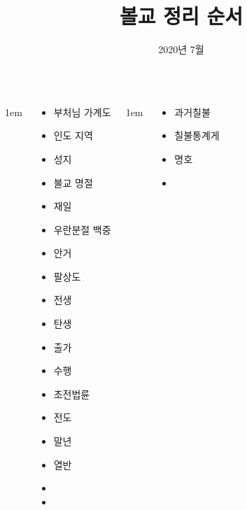 \documentclass[	20pt, 
							a0paper, 
							landscape,
							margin=0mm, %
							innermargin=10mm,  		%
							blockverticalspace=4mm, %
							colspace=5mm, 
							subcolspace=0mm
							]{tikzposter}
\title{ 볼교 정리 순서 }
\author{ 2020년 7월 }
\begin{document}
	\maketitle[
					width=841mm,
					linewidth = 2mm,
					innersep=4mm,
					titletotopverticalspace=2mm, %
					titletoblockverticalspace=2mm, %
					titletextscale =4, 
				]


	\begin{columns}


			{
					\setlength{\leftmargini}{4em}
					\setlength{\labelsep} {1em}
				\begin{LARGE}
					\begin{itemize}
					\item 부처님 가계도
					\item 인도 지역
					\item 성지
					\item 불교 명절
					\item 재일 
					\item 우란분절 백중
					\item 안거 

					\item 팔상도
					\item 전생
					\item 탄생
					\item 출가
					\item 수행
					\item 초전법륜
					\item 전도
					\item 말년
					\item 열반
					\item
					\item
					\end{itemize}
				\end{LARGE}
			} %


			{
					\setlength{\leftmargini}{4em}
					\setlength{\labelsep} {1em}
				\begin{LARGE}
					\begin{itemize}
					\item 과거칠불
					\item 칠불통계게
					\item 명호
					\item 
					\end{itemize}
				\end{LARGE}
			} %



\end{columns}
\end{document}
